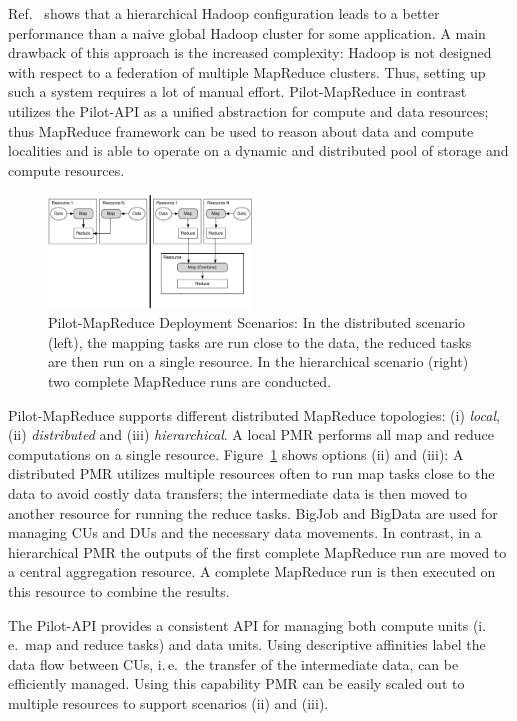 \documentclass[12pt]{report}
\newcommand{\pilotmapreduce}{Pilot-MapReduce\xspace}
\begin{document}
Ref.~\cite{weissman-mr-11} shows that a hierarchical Hadoop
configuration leads to a better performance than a naive global Hadoop
cluster for some application. A main drawback of this approach is the
increased complexity: Hadoop is not designed with respect to a
federation of multiple MapReduce clusters. Thus, setting up such a
system requires a lot of manual effort.  \pilotmapreduce in contrast
utilizes the Pilot-API as a unified abstraction for compute and data
resources; thus MapReduce framework can be used to reason about data
and compute localities and is able to operate on a dynamic and
distributed pool of storage and compute resources.


\begin{figure}
	\centering
	\includegraphics[width=0.48\textwidth]{figures/distributed_hierachical.pdf}
	\caption{\pilotmapreduce Deployment Scenarios: In the
          distributed scenario (left), the mapping tasks are run close
          to the data, the reduced tasks are then run on a single
          resource. In the hierarchical scenario (right) two complete
          MapReduce runs are
          conducted. \label{fid:distributed-mapreduce-overview}}
\end{figure}


\pilotmapreduce supports different distributed MapReduce topologies:
(i) \emph{local}, (ii) \emph{distributed} and (iii)
\emph{hierarchical}. A local PMR performs all map and reduce
computations on a single resource.
Figure~\ref{fid:distributed-mapreduce-overview} shows options (ii) and
(iii): A distributed PMR utilizes multiple resources often to run map
tasks close to the data to avoid costly data transfers; the
intermediate data is then moved to another resource for running the
reduce tasks. BigJob and BigData are used for managing CUs and DUs and
the necessary data movements. In contrast, in a hierarchical PMR the
outputs of the first complete MapReduce run are moved to a central
aggregation resource. A complete MapReduce run is then executed on
this resource to combine the results.

The Pilot-API provides a consistent API for managing both compute units (i.\,e.\ 
map and reduce tasks) and data units. Using descriptive affinities label the  
data flow between CUs, i.\,e.\ the transfer of the intermediate data, can be 
efficiently managed. Using this capability PMR can be easily scaled out to 
multiple resources to support scenarios (ii) and (iii). 
\end{document}
